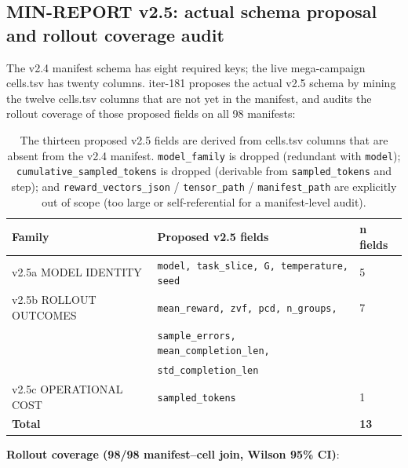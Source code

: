 \subsection{MIN-REPORT v2.5: actual schema proposal and rollout coverage audit}
\label{sec:p5-iter181-v25-rollout}

The v2.4 manifest schema has eight required keys; the live mega-campaign
cells.tsv has twenty columns. iter-181 proposes the actual v2.5 schema by
mining the twelve cells.tsv columns that are not yet in the manifest, and
audits the rollout coverage of those proposed fields on all 98 manifests:

\begin{table}[htbp]
\centering\small
\begin{tabular}{lll}
\hline
\textbf{Family} & \textbf{Proposed v2.5 fields} & \textbf{n fields} \\
\hline
v2.5a MODEL IDENTITY       & \texttt{model, task\_slice, G, temperature, seed}        & 5 \\
v2.5b ROLLOUT OUTCOMES     & \texttt{mean\_reward, zvf, pcd, n\_groups,}             & 7 \\
                            & \texttt{sample\_errors, mean\_completion\_len,}          &   \\
                            & \texttt{std\_completion\_len}                           &   \\
v2.5c OPERATIONAL COST     & \texttt{sampled\_tokens}                                & 1 \\
\hline
\textbf{Total} & & \textbf{13} \\
\hline
\end{tabular}
\caption{The thirteen proposed v2.5 fields are derived from cells.tsv
columns that are absent from the v2.4 manifest. \texttt{model\_family}
is dropped (redundant with \texttt{model}); \texttt{cumulative\_sampled\_tokens}
is dropped (derivable from \texttt{sampled\_tokens} and step); and
\texttt{reward\_vectors\_json} / \texttt{tensor\_path} / \texttt{manifest\_path}
are explicitly out of scope (too large or self-referential for a manifest-level audit).}
\label{tab:p5-v25-fields}
\end{table}

\noindent\textbf{Rollout coverage (98/98 manifest--cell join, Wilson 95\% CI)}:

